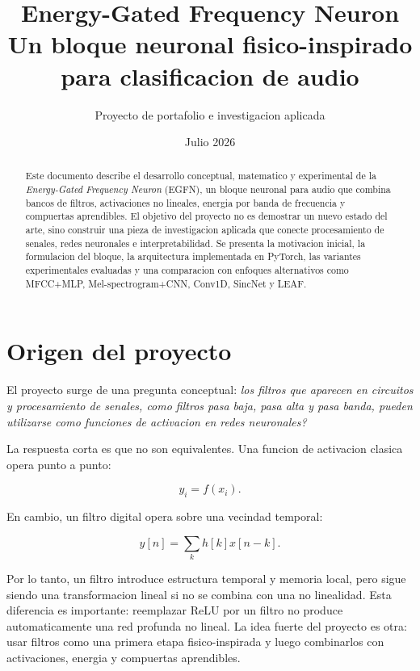 \documentclass[11pt,letterpaper]{article}
\title{\textbf{Energy-Gated Frequency Neuron}\\
\large Un bloque neuronal fisico-inspirado para clasificacion de audio}
\author{Proyecto de portafolio e investigacion aplicada}
\date{Julio 2026}
\begin{document}
\maketitle

\begin{abstract}
Este documento describe el desarrollo conceptual, matematico y experimental de
la \textit{Energy-Gated Frequency Neuron} (EGFN), un bloque neuronal para audio
que combina bancos de filtros, activaciones no lineales, energia por banda de
frecuencia y compuertas aprendibles. El objetivo del proyecto no es demostrar
un nuevo estado del arte, sino construir una pieza de investigacion aplicada
que conecte procesamiento de senales, redes neuronales e interpretabilidad. Se
presenta la motivacion inicial, la formulacion del bloque, la arquitectura
implementada en PyTorch, las variantes experimentales evaluadas y una
comparacion con enfoques alternativos como MFCC+MLP, Mel-spectrogram+CNN,
Conv1D, SincNet y LEAF.
\end{abstract}

\tableofcontents
\newpage

\section{Origen del proyecto}

El proyecto surge de una pregunta conceptual: \textit{los filtros que aparecen
en circuitos y procesamiento de senales, como filtros pasa baja, pasa alta y
pasa banda, pueden utilizarse como funciones de activacion en redes
neuronales?}

La respuesta corta es que no son equivalentes. Una funcion de activacion
clasica opera punto a punto:

\begin{equation}
    y_i = f(x_i).
\end{equation}

En cambio, un filtro digital opera sobre una vecindad temporal:

\begin{equation}
    y[n] = \sum_k h[k]x[n-k].
\end{equation}

Por lo tanto, un filtro introduce estructura temporal y memoria local, pero
sigue siendo una transformacion lineal si no se combina con una no linealidad.
Esta diferencia es importante: reemplazar ReLU por un filtro no produce
automaticamente una red profunda no lineal. La idea fuerte del proyecto es otra:
usar filtros como una primera etapa fisico-inspirada y luego combinarlos con
activaciones, energia y compuertas aprendibles.
\end{document}
